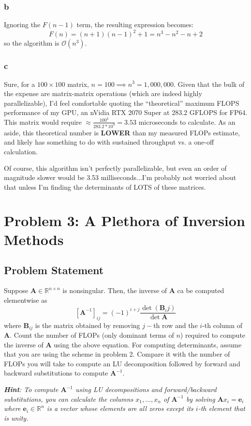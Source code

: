\documentclass[11pt]{report}
\theoremstyle{definition}
\newcommand{\mat}[1]{\mathbf{#1}}
\begin{document}
\subsubsection*{b}
Ignoring the $F(n-1)$ term, the resulting expression becomes:
\[F(n) = (n+1)(n-1)^2+1 = n^3-n^2-n+2\]
so the algorithm is $\mathcal{O}(n^3)$.

\subsubsection*{c}
Sure, for a $100\times100$ matrix, $n=100\implies n^3=1,000,000$. Given that the
bulk of the expense are matrix-matrix operations (which are indeed highly
parallelizable), I'd feel comfortable quoting the ``theoretical'' maximum FLOPS
performance of my GPU, an nVidia RTX 2070 Super at 283.2 GFLOPS for FP64.  This
matrix would require $\approx \frac{100^3}{283.2*10^9}=3.53$ microseconds to
calculate. As an aside, this theoretical number is \textbf{LOWER} than my
measured FLOPs estimate, and likely has something to do with sustained
throughput vs. a one-off calculation.

Of course, this algorithm isn't perfectly parallelizable, but even an order of
magnitude slower would be 3.53 milliseconds...I'm probably not worried about
that unless I'm finding the determinants of LOTS of these matrices.

\newpage
\section*{Problem 3: A Plethora of Inversion Methods}
\subsection*{Problem Statement}
Suppose $\mat{A}\in\mathbb{R}^{n\times n}$ is nonsingular. Then, the inverse of
$\mat{A}$ ca be computed elementwise as
\[ \left[\mat{A}^{-1}\right]_{ij} = (-1)^{i+j}\frac{\det(\mat{B}_ij)}{\det{\mat{A}}} \]
where $\mat{B}_{ij}$ is the matrix obtained by removing $j-$th row and the
$i$-th column of $\mat{A}$. Count the number of FLOPs (only dominant terms of
$n$) required to compute the inverse of $\mat{A}$ using the above equation. For
computing determinants, assume that you are using the scheme in problem 2.
Compare it with the number of FLOPs you will take to compute an LU decomposition
followed by forward and backward substitutions to compute $\mat{A}^{-1}$.

\textit{
	\textbf{Hint}: To compute $\mat{A}^{-1}$ using LU decompositions and
	forward/backward substitutions, you can calculate the columns $x_1,\ldots,x_n$
	of $\mat{A}^{-1}$ by solving $\mat{A}x_i=\mat{e}_i$ where $\mat{e}_i\in\mathbb{R}^n$
	is a vector whose elements are all zeros except its $i$-th element that is unity.
}
\end{document}
